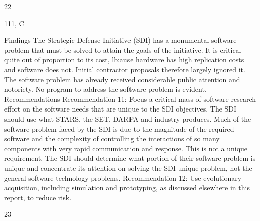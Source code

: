 \documentclass[12pt]{article}
\begin{document}
22

111, C

Findings
The Strategic Defense Initiative (SDI) has a monumental software problem
that must be solved to attain the goals of the initiative.
It is critical quite out of proportion to its cost, lb:ause hardware has high replication
costs and software does not. Initial contractor proposals therefore largely ignored it.
The software problem has already received considerable public attention
and notoriety.
No program to address the software problem is evident.
Recommendations
Recommendation 11: Focus a critical mass of software research effort on
the software needs that are unique to the SDI objectives.
The SDI should use what STARS, the SET, DARPA and industry produces. Much of
the software problem faced by the SDI is due to the magnitude of the required software
and the complexity of controlling the interactions of so many components with very rapid
communication and response. This is not a unique requirement. The SDI should determine
what portion of their software problem is unique and concentrate its attention on solving
the SDI-unique problem, not the general software technology problems.
Recommendation 12: Use evolutionary acquisition, including simulation
and prototyping, as discussed elsewhere in this report, to reduce risk.

23
\end{document}
